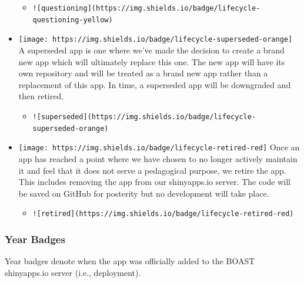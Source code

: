 \documentclass[
]{book}
\providecommand{\tightlist}{%
  \setlength{\itemsep}{0pt}\setlength{\parskip}{0pt}}
\begin{document}
\begin{itemize}
  \begin{itemize}
  \tightlist
  \item
    \texttt{!{[}questioning{]}(https://img.shields.io/badge/lifecycle-questioning-yellow)}
  \end{itemize}
\item
  \texttt{[image: https://img.shields.io/badge/lifecycle-superseded-orange]} A superseded app is one where we've made the decision to create a brand new app which will ultimately replace this one. The new app will have its own repository and will be treated as a brand new app rather than a replacement of this app. In time, a superseded app will be downgraded and then retired.

  \begin{itemize}
  \tightlist
  \item
    \texttt{!{[}superseded{]}(https://img.shields.io/badge/lifecycle-superseded-orange)}
  \end{itemize}
\item
  \texttt{[image: https://img.shields.io/badge/lifecycle-retired-red]} Once an app has reached a point where we have chosen to no longer actively maintain it and feel that it does not serve a pedagogical purpose, we retire the app. This includes removing the app from our shinyapps.io server. The code will be saved on GitHub for posterity but no development will take place.

  \begin{itemize}
  \tightlist
  \item
    \texttt{!{[}retired{]}(https://img.shields.io/badge/lifecycle-retired-red)}
  \end{itemize}
\end{itemize}

\hypertarget{year-badges}{%
\subsubsection{Year Badges}\label{year-badges}}

Year badges denote when the app was officially added to the BOAST shinyapps.io server (i.e., deployment).
\end{document}
